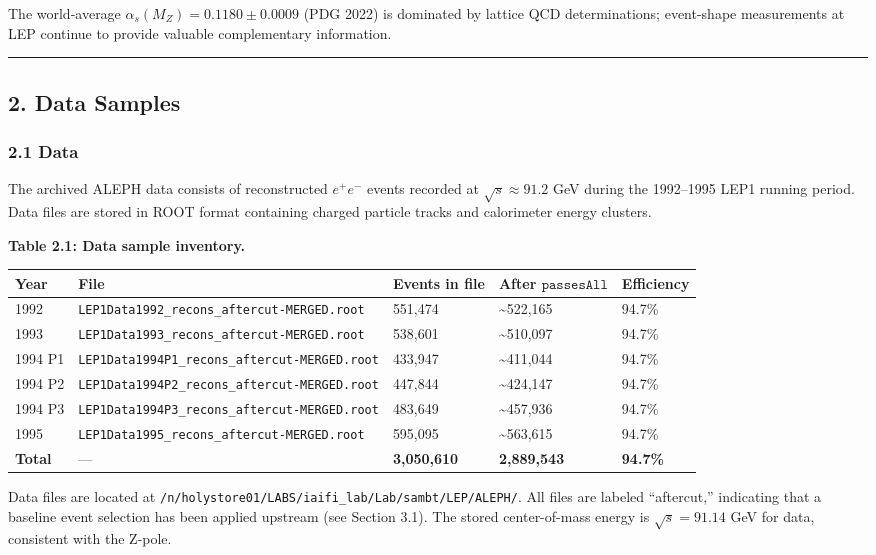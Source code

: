 \documentclass[11pt,]{article}
\begin{document}
The world-average \(\alpha_s(M_Z) = 0.1180 \pm 0.0009\) (PDG 2022) is
dominated by lattice QCD determinations; event-shape measurements at LEP
continue to provide valuable complementary information.

\begin{center}\rule{0.5\linewidth}{\linethickness}\end{center}

\hypertarget{data-samples}{%
\subsection{2. Data Samples}\label{data-samples}}

\hypertarget{data}{%
\subsubsection{2.1 Data}\label{data}}

The archived ALEPH data consists of reconstructed \(e^+e^-\) events
recorded at \(\sqrt{s} \approx 91.2\) GeV during the 1992--1995 LEP1
running period. Data files are stored in ROOT format containing charged
particle tracks and calorimeter energy clusters.

\textbf{Table 2.1: Data sample inventory.}

\begin{longtable}[]{@{}lllll@{}}
\toprule
Year & File & Events in file & After \(\texttt{passesAll}\) &
Efficiency\tabularnewline
\midrule
\endhead
1992 & \texttt{LEP1Data1992\_recons\_aftercut-MERGED.root} & 551,474 &
\textasciitilde{}522,165 & 94.7\%\tabularnewline
1993 & \texttt{LEP1Data1993\_recons\_aftercut-MERGED.root} & 538,601 &
\textasciitilde{}510,097 & 94.7\%\tabularnewline
1994 P1 & \texttt{LEP1Data1994P1\_recons\_aftercut-MERGED.root} &
433,947 & \textasciitilde{}411,044 & 94.7\%\tabularnewline
1994 P2 & \texttt{LEP1Data1994P2\_recons\_aftercut-MERGED.root} &
447,844 & \textasciitilde{}424,147 & 94.7\%\tabularnewline
1994 P3 & \texttt{LEP1Data1994P3\_recons\_aftercut-MERGED.root} &
483,649 & \textasciitilde{}457,936 & 94.7\%\tabularnewline
1995 & \texttt{LEP1Data1995\_recons\_aftercut-MERGED.root} & 595,095 &
\textasciitilde{}563,615 & 94.7\%\tabularnewline
\textbf{Total} & --- & \textbf{3,050,610} & \textbf{2,889,543} &
\textbf{94.7\%}\tabularnewline
\bottomrule
\end{longtable}

Data files are located at
\texttt{/n/holystore01/LABS/iaifi\_lab/Lab/sambt/LEP/ALEPH/}. All files
are labeled ``aftercut,'' indicating that a baseline event selection has
been applied upstream (see Section 3.1). The stored center-of-mass
energy is \(\sqrt{s} = 91.14\) GeV for data, consistent with the Z-pole.
\end{document}
